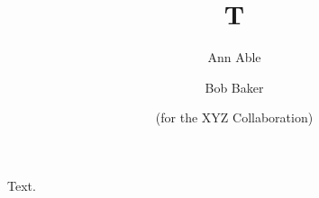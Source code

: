 \documentclass{elsarticle}
\begin{document}
\begin{frontmatter}
\title{T}
\author{Ann Able}
\author{Bob Baker}
\address{Univ X}
\author{(for the XYZ Collaboration)}
\end{frontmatter}
Text.
\end{document}
